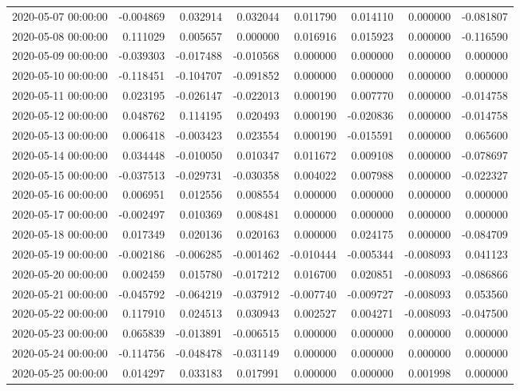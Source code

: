 \begin{tabular}{lrrrrrrr}
2020-05-07 00:00:00 & -0.004869 & 0.032914 & 0.032044 & 0.011790 & 0.014110 & 0.000000 & -0.081807 \\
2020-05-08 00:00:00 & 0.111029 & 0.005657 & 0.000000 & 0.016916 & 0.015923 & 0.000000 & -0.116590 \\
2020-05-09 00:00:00 & -0.039303 & -0.017488 & -0.010568 & 0.000000 & 0.000000 & 0.000000 & 0.000000 \\
2020-05-10 00:00:00 & -0.118451 & -0.104707 & -0.091852 & 0.000000 & 0.000000 & 0.000000 & 0.000000 \\
2020-05-11 00:00:00 & 0.023195 & -0.026147 & -0.022013 & 0.000190 & 0.007770 & 0.000000 & -0.014758 \\
2020-05-12 00:00:00 & 0.048762 & 0.114195 & 0.020493 & 0.000190 & -0.020836 & 0.000000 & -0.014758 \\
2020-05-13 00:00:00 & 0.006418 & -0.003423 & 0.023554 & 0.000190 & -0.015591 & 0.000000 & 0.065600 \\
2020-05-14 00:00:00 & 0.034448 & -0.010050 & 0.010347 & 0.011672 & 0.009108 & 0.000000 & -0.078697 \\
2020-05-15 00:00:00 & -0.037513 & -0.029731 & -0.030358 & 0.004022 & 0.007988 & 0.000000 & -0.022327 \\
2020-05-16 00:00:00 & 0.006951 & 0.012556 & 0.008554 & 0.000000 & 0.000000 & 0.000000 & 0.000000 \\
2020-05-17 00:00:00 & -0.002497 & 0.010369 & 0.008481 & 0.000000 & 0.000000 & 0.000000 & 0.000000 \\
2020-05-18 00:00:00 & 0.017349 & 0.020136 & 0.020163 & 0.000000 & 0.024175 & 0.000000 & -0.084709 \\
2020-05-19 00:00:00 & -0.002186 & -0.006285 & -0.001462 & -0.010444 & -0.005344 & -0.008093 & 0.041123 \\
2020-05-20 00:00:00 & 0.002459 & 0.015780 & -0.017212 & 0.016700 & 0.020851 & -0.008093 & -0.086866 \\
2020-05-21 00:00:00 & -0.045792 & -0.064219 & -0.037912 & -0.007740 & -0.009727 & -0.008093 & 0.053560 \\
2020-05-22 00:00:00 & 0.117910 & 0.024513 & 0.030943 & 0.002527 & 0.004271 & -0.008093 & -0.047500 \\
2020-05-23 00:00:00 & 0.065839 & -0.013891 & -0.006515 & 0.000000 & 0.000000 & 0.000000 & 0.000000 \\
2020-05-24 00:00:00 & -0.114756 & -0.048478 & -0.031149 & 0.000000 & 0.000000 & 0.000000 & 0.000000 \\
2020-05-25 00:00:00 & 0.014297 & 0.033183 & 0.017991 & 0.000000 & 0.000000 & 0.001998 & 0.000000 \\

\end{tabular}
